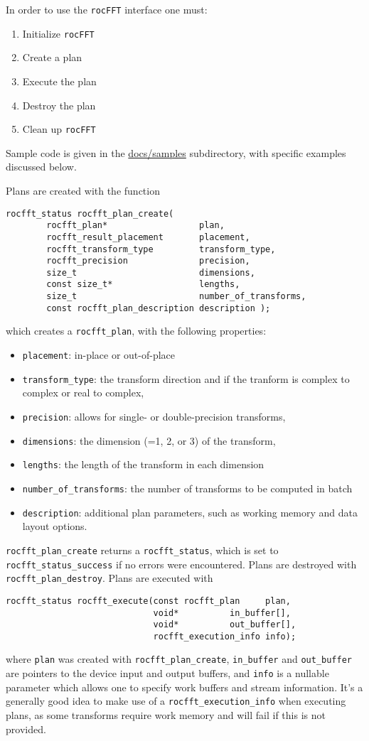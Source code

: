 \documentclass[10pt]{article}
\renewcommand{\(}{\left(}
\renewcommand{\)}{\right)}
\begin{document}
In order to use the \texttt{rocFFT} interface one must:
\begin{enumerate}
\item Initialize \texttt{rocFFT} 
\item Create a plan
\item Execute the plan
\item Destroy the plan
\item Clean up \texttt{rocFFT}
\end{enumerate}
Sample code is given in the \url{docs/samples} subdirectory, with
specific examples discussed below.

Plans are created with the function
\begin{lstlisting}
rocfft_status rocfft_plan_create(
        rocfft_plan*                  plan,
        rocfft_result_placement       placement,
        rocfft_transform_type         transform_type,
        rocfft_precision              precision,
        size_t                        dimensions,
        const size_t*                 lengths,
        size_t                        number_of_transforms,
        const rocfft_plan_description description );
\end{lstlisting}
which creates a \lstinline{rocfft_plan}, with the following properties:
\begin{itemize}
\item \lstinline{placement}: in-place or out-of-place
\item \lstinline{transform_type}: the transform
  direction and if the tranform is complex to complex or real to complex,
\item \lstinline{precision}: allows for single- or
  double-precision transforms,
\item \lstinline{dimensions}: the dimension (=1, 2, or 3) of the
  transform,
\item \lstinline{lengths}: the length of the transform in each dimension
\item \lstinline{number_of_transforms}: the number of transforms to be
  computed in batch
\item \lstinline{description}: additional plan parameters, such as
  working memory and data layout options.
\end{itemize}
\lstinline{rocfft_plan_create} returns a \lstinline{rocfft_status},
which is set to \lstinline{rocfft_status_success} if no errors were
encountered.  Plans are destroyed with
\lstinline{rocfft_plan_destroy}.  Plans are executed with
\begin{lstlisting}
rocfft_status rocfft_execute(const rocfft_plan     plan,
                             void*          in_buffer[],
                             void*          out_buffer[],
                             rocfft_execution_info info);
\end{lstlisting}
where \lstinline{plan} was created with
\lstinline{rocfft_plan_create}, \lstinline{in_buffer} and
\lstinline{out_buffer} are pointers to the device input and output
buffers, and \lstinline{info} is a nullable parameter which allows one
to specify work buffers and stream information.  It's a generally good
idea to make use of a \lstinline{rocfft_execution_info} when executing
plans, as some transforms require work memory and will fail if this is
not provided.
\end{document}
